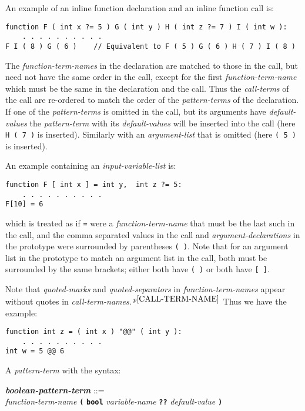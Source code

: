 \documentclass[12pt]{article}
\newcommand{\TT}[1]{{\tt \bfseries #1}}
\newcommand{\emkey}[1]{{\em \bfseries #1}}
\newcommand{\pagnote}[1]{$\,^{p\pageref{#1}}$}
\newenvironment{indpar}[1][0.3in]%
	{\begin{list}{}%
		     {\setlength{\itemsep}{0in}%
		      \setlength{\topsep}{0in}%
		      \setlength{\parsep}{1ex}%
		      \setlength{\labelwidth}{#1}%
		      \setlength{\leftmargin}{#1}%
		      \addtolength{\leftmargin}{\labelsep}}%
	 \item}%
	{\end{list}}
\begin{document}
An example of an inline function declaration and an inline function call is:
\begin{indpar}\begin{verbatim}
function F ( int x ?= 5 ) G ( int y ) H ( int z ?= 7 ) I ( int w ):
    . . . . . . . . . .
F I ( 8 ) G ( 6 )    // Equivalent to F ( 5 ) G ( 6 ) H ( 7 ) I ( 8 )
\end{verbatim}\end{indpar}

The {\em function-term-names} in the declaration are matched to those
in the call, but need not have the same order in the call, except for
the first {\em function-term-name} which must be the same in the
declaration and the call.  Thus the {\em call-terms} of the call
are re-ordered to match the order of the {\em pattern-terms} of the
declaration.  If one of the {\em pattern-terms} is omitted in the
call, but its arguments have {\em default-values}
the {\em pattern-term} with its
{\em default-values} will be inserted into the call
(here {\tt H ( 7 )} is inserted).
Similarly with an {\em argument-list} that is omitted
(here {\tt ( 5 )} is inserted).

An example containing an {\em input-variable-list} is:
\begin{indpar}\begin{verbatim}
function F [ int x ] = int y,  int z ?= 5:
    . . . . . . . . . .
F[10] = 6
\end{verbatim}\end{indpar}
which is treated as if {\tt =} were a {\em function-term-name}
that must be the last such in the call, and the comma separated
values in the call and {\em argument-declarations} in the prototype
were surrounded by parentheses {\tt (~)}.  Note that for an argument
list in the prototype to match an argument list in the call, both
must be surrounded by the same brackets; either both have {\tt (~)}
or both have {\tt [~]}.

Note that {\em quoted-marks} and {\em quoted-separators}
in {\em function-term-names} appear without quotes in
{\em call-term-names}.\pagnote{CALL-TERM-NAME}  Thus we have the example:
\begin{indpar}\begin{verbatim}
function int z = ( int x ) "@@" ( int y ):
    . . . . . . . . . .
int w = 5 @@ 6
\end{verbatim}\end{indpar}

A {\em pattern-term} with the syntax:
\begin{indpar}
\emkey{boolean-pattern-term}\label{BOOLEAN-PATTERN-TERM} ::= \\
\hspace*{1in} {\em function-term-name} \TT{(}
        \TT{bool} {\em variable-name}
	\TT{??} {\em default-value} \TT{)}
\end{indpar}
\end{document}
